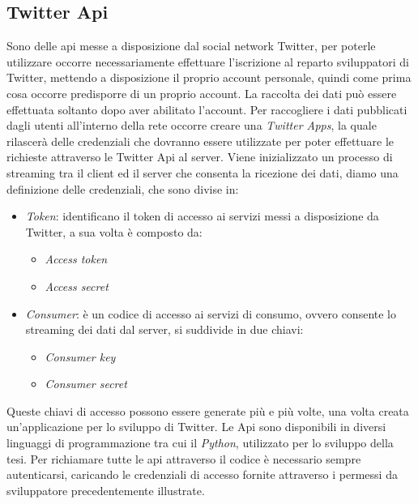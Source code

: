 \subsection{Twitter Api}
Sono delle api messe a disposizione dal social network Twitter, per poterle utilizzare occorre necessariamente effettuare l'iscrizione al reparto sviluppatori di Twitter, mettendo a disposizione il proprio account personale, quindi come prima cosa occorre predisporre di un proprio account. La raccolta dei dati può essere effettuata soltanto dopo aver abilitato l'account. Per raccogliere i dati pubblicati dagli utenti all'interno della rete occorre creare una \textit{Twitter Apps}, la quale rilascerà delle credenziali che dovranno essere utilizzate per poter effettuare le richieste attraverso le Twitter Api al server. Viene inizializzato un processo di streaming tra il client ed il server che consenta la ricezione dei dati, diamo una definizione delle credenziali, che sono divise in:
\begin{itemize}
\item \textit{Token}: identificano il token di accesso ai servizi messi a disposizione da Twitter, a sua volta è composto da:
\begin{itemize}
\item \textit{Access token}
\item \textit{Access secret}
\end{itemize}
\item \textit{Consumer}: è un codice di accesso ai servizi di consumo, ovvero consente lo streaming dei dati dal server, si suddivide in due chiavi:
\begin{itemize}
\item \textit{Consumer key}
\item \textit{Consumer secret}
\end{itemize}
\end{itemize}
Queste chiavi di accesso possono essere generate più e più volte, una volta creata un'applicazione per lo sviluppo di Twitter.
Le Api sono disponibili in diversi linguaggi di programmazione tra cui il \textit{Python}, utilizzato per lo sviluppo della tesi.
Per richiamare tutte le api attraverso il codice è necessario sempre autenticarsi, caricando le credenziali di accesso  fornite attraverso i permessi da sviluppatore precedentemente illustrate.
